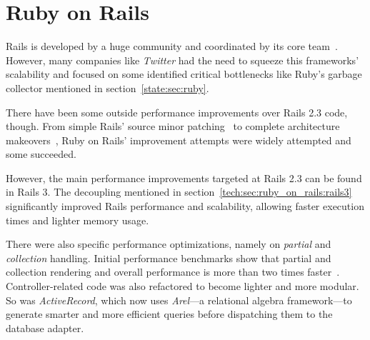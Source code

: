 \section{Ruby on Rails} %
\label{state:sec:ruby_on_rails}
Rails is developed by a huge community and coordinated by its core team~\cite{rails_core_team}. However, many companies like \textit{Twitter} had the need to squeeze this frameworks' scalability and focused on some identified critical bottlenecks like Ruby's garbage collector mentioned in section~\ref{state:sec:ruby}.

There have been some outside performance improvements over Rails 2.3 code, though. From simple Rails' source minor patching~\cite{accunote_rails} to complete architecture makeovers~\cite{distributed_rails}, Ruby on Rails' improvement attempts were widely attempted and some succeeded.

However, the main performance improvements targeted at Rails 2.3 can be found in Rails 3. The decoupling mentioned in section~\ref{tech:sec:ruby_on_rails:rails3} significantly improved Rails performance and scalability, allowing faster execution times and lighter memory usage.

There were also specific performance optimizations, namely on \textit{partial} and \textit{collection} handling. Initial performance benchmarks show that partial and collection rendering and overall performance is more than two times faster~\cite{vaporware_to_awesome,rails_merb_merge_performance}. Controller-related code was also refactored to become lighter and more modular. So was \textit{ActiveRecord}, which now uses \textit{Arel}---a relational algebra framework---to generate smarter and more efficient queries before dispatching them to the database adapter.

